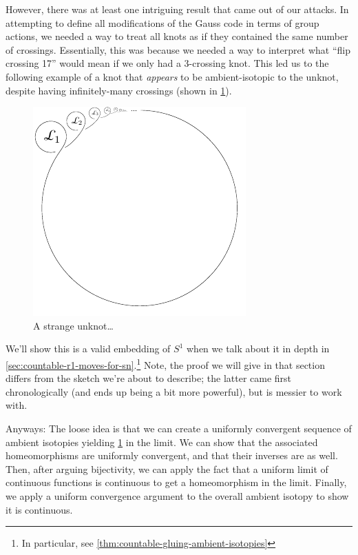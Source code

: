 However, there was at least one intriguing result that came out of our
attacks. In attempting to define all modifications of the Gauss code
in terms of group actions, we needed a way to treat all knots as if
they contained the same number of crossings. Essentially, this was
because we needed a way to interpret what ``flip crossing 17'' would
mean if we only had a 3-crossing knot. This led us to the following
example of a knot that \emph{appears} to be ambient-isotopic to the
unknot, despite having infinitely-many crossings (shown in
\cref{fig:pref-strange-unknot}).
\begin{figure}[H]
  \centering
  \includegraphics[width=.6\linewidth]{figures/rectifiable-knots/winf.pdf}
  \caption{A strange unknot\ldots}
  \label{fig:pref-strange-unknot}
\end{figure}
We'll show this is a valid embedding of $S^1$ when we talk about it in
depth in \cref{sec:countable-r1-moves-for-sn}.\footnote{In particular,
  see \cref{thm:countable-gluing-ambient-isotopies}} Note, the proof
we will give in that section differs from the sketch we're about to
describe; the latter came first chronologically (and ends up being a
bit more powerful), but is messier to work with.

Anyways: The loose idea is that we can create a uniformly convergent
sequence of ambient isotopies yielding \cref{fig:pref-strange-unknot}
in the limit. We can show that the associated homeomorphisms are
uniformly convergent, and that their inverses are as well. Then, after
arguing bijectivity, we can apply the fact that a uniform limit of
continuous functions is continuous to get a homeomorphism in the
limit. Finally, we apply a uniform convergence argument to the overall
ambient isotopy to show it is continuous.



